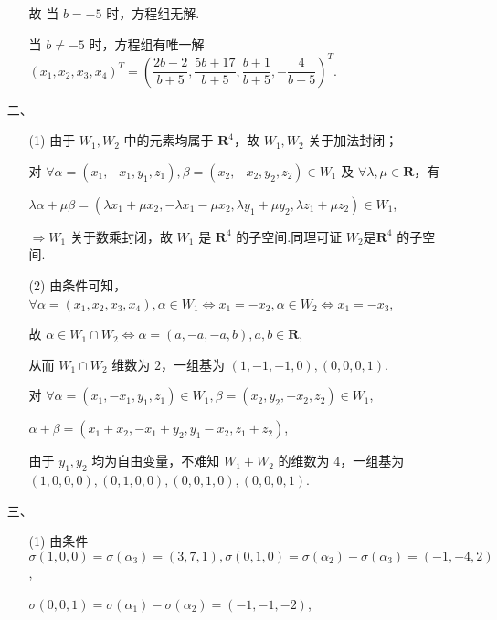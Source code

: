 \documentclass{ctexbook}
\begin{document}
\begin{enumerate}
    \begin{enumerate}
        \item[故]当 \(b=-5\) 时，方程组无解.
        \item[] 当 \(b\neq -5\) 时，方程组有唯一解 \((x_1,x_2,x_3,x_4)^{T}=(\dfrac{2b-2}{b+5},\dfrac{5b+17}{b+5},\dfrac{b+1}{b+5},-\dfrac{4}{b+5})^{T}\).
    \end{enumerate}
    \item[二、]
    \begin{enumerate}
        \item[(1)] 由于 \(W_1,W_2\) 中的元素均属于 \(\mathbf{R}^4\)，故 \(W_1,W_2\) 关于加法封闭；\par
        对 \(\forall \alpha=(x_1,-x_1,y_1,z_1),\beta=(x_2,-x_2,y_2,z_2) \in W_1\) 及 \(\forall \lambda,\mu\in \mathbf{R}\)，有\par
        \(\lambda\alpha+\mu\beta=(\lambda x_1+\mu x_2,-\lambda x_1-\mu x_2,\lambda y_1+\mu y_2,\lambda z_1+\mu z_2)\in W_1\),\par
        \(\Rightarrow W_1\) 关于数乘封闭，故 \(W_1\) 是 \(\mathbf{R}^4\) 的子空间.同理可证 \(W_2\)是\(\mathbf{R}^4\) 的子空间.\par
        \item[(2)] 由条件可知，\(\forall \alpha=(x_1,x_2,x_3,x_4),\alpha\in W_1 \Leftrightarrow x_1=-x_2,\alpha\in W_2 \Leftrightarrow x_1=-x_3\),\par
        故 \(\alpha\in W_1\cap W_2 \Leftrightarrow \alpha=(a,-a,-a,b),a,b\in \mathbf{R}\),\par
        从而 \(W_1\cap W_2\) 维数为 \(2\)，一组基为 \((1,-1,-1,0),(0,0,0,1)\).\par
        对 \(\forall \alpha=(x_1,-x_1,y_1,z_1)\in W_1,\beta=(x_2,y_2,-x_2,z_2) \in W_1\),\par
        \(\alpha+\beta=(x_1+x_2,-x_1+y_2,y_1-x_2,z_1+z_2)\),\par
        由于 \(y_1,y_2\) 均为自由变量，不难知 \(W_1+W_2\) 的维数为 \(4\)，一组基为 \((1,0,0,0),(0,1,0,0),(0,0,1,0),(0,0,0,1)\).\par
    \end{enumerate}
    \item[三、]
    \begin{enumerate}
        \item[(1)] 由条件 \(\sigma(1,0,0)=\sigma(\alpha_3)=(3,7,1),\sigma(0,1,0)=\sigma(\alpha_2)-\sigma(\alpha_3)=(-1,-4,2)\),\par
        \(\sigma(0,0,1)=\sigma(\alpha_1)-\sigma(\alpha_2)=(-1,-1,-2)\),\par

\end{enumerate}
\end{enumerate}
\end{document}
